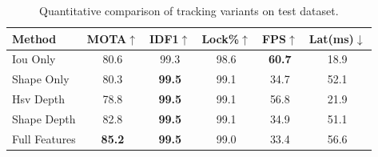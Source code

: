 \begin{table}[t]
\centering
\caption{Quantitative comparison of tracking variants on test dataset.}
\label{tab:results}
\begin{tabular}{l|ccc|cc}
\hline
Method & MOTA$\uparrow$ & IDF1$\uparrow$ & Lock\%$\uparrow$ & FPS$\uparrow$ & Lat(ms)$\downarrow$ \\
\hline
Iou Only & 80.6 & 99.3 & 98.6 & \textbf{60.7} & 18.9 \\
Shape Only & 80.3 & \textbf{99.5} & 99.1 & 34.7 & 52.1 \\
Hsv Depth & 78.8 & \textbf{99.5} & 99.1 & 56.8 & 21.9 \\
Shape Depth & 82.8 & \textbf{99.5} & 99.1 & 34.9 & 51.1 \\
Full Features & \textbf{85.2} & \textbf{99.5} & 99.0 & 33.4 & 56.6 \\
\hline
\end{tabular}
\end{table}
